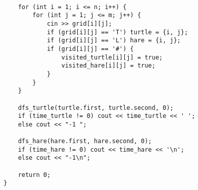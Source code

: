 \documentclass[11pt,fancychapters]{article}
\begin{document}
\begin{lstlisting}[style=c++]
    
    for (int i = 1; i <= n; i++) {
        for (int j = 1; j <= m; j++) {
            cin >> grid[i][j];
            if (grid[i][j] == 'T') turtle = {i, j};
            if (grid[i][j] == 'L') hare = {i, j};
            if (grid[i][j] == '#') {
                visited_turtle[i][j] = true;
                visited_hare[i][j] = true;
            }
        }
    }
    
    dfs_turtle(turtle.first, turtle.second, 0);
    if (time_turtle != 0) cout << time_turtle << ' ';
    else cout << "-1 ";
    
    dfs_hare(hare.first, hare.second, 0);
    if (time_hare != 0) cout << time_hare << '\n';
    else cout << "-1\n";
 
    return 0;
}
\end{lstlisting}
\end{document}
